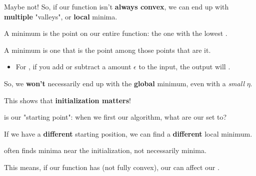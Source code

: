         Maybe not! So, if our function isn't \textbf{always convex}, we can end up with \textbf{multiple} "valleys", or \textbf{local} minima.\\
        
        \begin{definition}
            A  minimum is the  point on our entire function: the one with the lowest .
            
            A  minimum is one that is the  point among those points that are  it.
            
            \begin{itemize}
                \item For , if you add or subtract a  amount $\epsilon$ to the input, the output will .
            \end{itemize}
            
        \end{definition}
        
        So, we \textbf{won't} necessarily end up with the \textbf{global} minimum, even with a \textit{small} $\eta$.
        
        This shows that \textbf{initialization matters}!\\
        
        \begin{definition}
             is our "starting point": when we first  our algorithm, what are our  set to?
        \end{definition}
        
        If we have a \textbf{different} starting position, we can find a \textbf{different} local minimum.\\
        
        \begin{concept}
             often finds  minima near the initialization, not necessarily  minima.
            
            This means, if our function has  (not fully convex), our  can affect our .
        \end{concept}

\pagebreak

